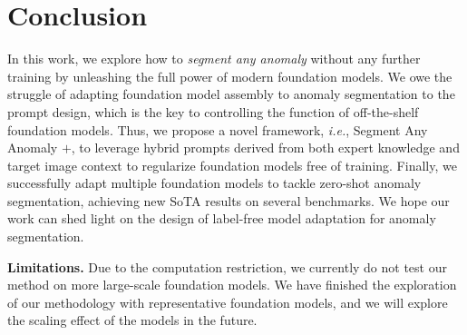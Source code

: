 \documentclass{article}
\begin{document}
\section{Conclusion}

In this work, we explore how to \textit{segment any anomaly} without any further training by unleashing the full power of modern foundation models. We owe the struggle of adapting foundation model assembly to anomaly segmentation to the prompt design, which is the key to controlling the function of off-the-shelf foundation models. Thus, we propose a novel framework, \textit{i.e.}, Segment Any Anomaly $+$, to leverage hybrid prompts derived from both expert knowledge and target image context to regularize foundation models free of training. Finally, we successfully adapt multiple foundation models to tackle zero-shot anomaly segmentation, achieving new SoTA results on several benchmarks. We hope our work can shed light on the design of label-free model adaptation for anomaly segmentation.

\textbf{Limitations.} Due to the computation restriction, we currently do not test our method on more large-scale foundation models. We have finished the exploration of our methodology with representative foundation models, and we will explore the scaling effect of the models in the future.
\end{document}
